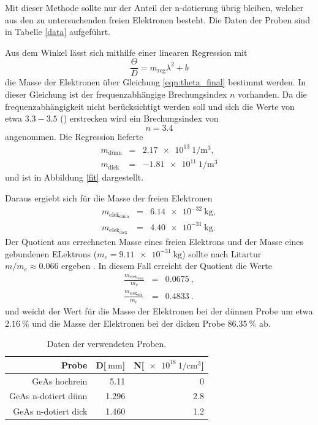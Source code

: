 Mit dieser Methode sollte nur der Anteil der n-dotierung übrig bleiben, welcher aus den zu untersuchenden freien Elektronen besteht.
Die Daten der Proben sind in Tabelle \ref{data} aufgeführt.

Aus dem Winkel lässt sich mithilfe einer linearen Regression mit
\begin{equation*}
	\frac{\Theta}{D} = m_\text{reg} \lambda^2 + b
\end{equation*}
die Masse der Elektronen über Gleichung \eqref{eqn:theta_final} bestimmt werden.
In dieser Gleichung ist der frequenzabhängige Brechungsindex $n$ vorhanden. Da die frequenzabhängigkeit nicht berücksichtigt werden soll und sich die Werte von etwa $3.3-3.5$ (\cite{GeAs}) erstrecken wird ein Brechungsindex von 
\begin{equation*}
	n = 3.4
\end{equation*}
angenommen.
Die Regression lieferte 
\begin{eqnarray*}
	m_\text{dünn} &=& \SI{2.17e13}{1\per\meter^3},\\
	m_\text{dick} &=& \SI{-1.81e11}{1\per\meter^3}
\end{eqnarray*}
und ist in Abbildung \ref{fit} dargestellt.

Daraus ergiebt sich für die Masse der freien Elektronen
\begin{eqnarray*}
	m_{\text{elek}_\text{dünn}} &=& \SI{6.14e-32}{\kilogram},\\
	m_{\text{elek}_\text{dick}} &=& \SI{4.40e-31}{\kilogram}.
\end{eqnarray*}
Der Quotient aus errechneten Masse eines freien Elektrons und der Masse eines gebundenen ELektrons ($m_e = \SI{9.11e-31}{\kilogram}$) sollte nach Litartur $m/m_e \approx 0.066$ ergeben \cite{kittel}.
In diesem Fall erreicht der Quotient die Werte
\begin{eqnarray*}
	\frac{m_{\text{elek}_\text{dünn}}}{m_\text{e}} &=& \SI{0.0675}{},\\
	\frac{m_{\text{elek}_\text{dick}}}{m_\text{e}} &=& \SI{0.4833}{}.
\end{eqnarray*}
und weicht der Wert für die Masse der Elektronen bei der dünnen Probe um etwa $\SI{2.16}{\percent}$ und die Masse der Elektronen bei der dicken Probe $\SI{86.35}{\percent}$ ab.

\begin{table}
	\centering
	\caption{Daten der verwendeten Proben.}
	\begin{tabular}{r r r}
		Probe & D[$\SI{}{\milli\meter}$]& N[$\SI{e18}{1\per\centi\meter^3}$]\\ 
		\hline	\hline
		GeAs hochrein & 5.11 & 0\\
		GeAs n-dotiert dünn & 1.296 & 2.8\\
		GeAs n-dotiert dick & 1.460 & 1.2\\
	\end{tabular}
\end{table}

